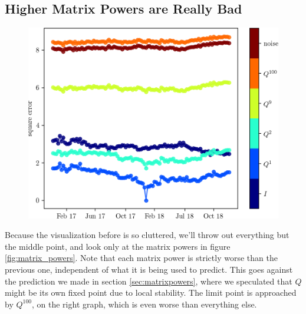 \documentclass{article}
\theoremstyle{definition}
\begin{document}
	\clearpage
	\subsection{Higher Matrix Powers are Really Bad}
	
	\begin{figure}
		\includegraphics[width=\linewidth]{figs/t_vs_err/Q_powers_limit.png}
	\end{figure}
	Because the visualization before is so cluttered, we'll throw out everything but the middle point, and look only at the matrix powers in figure \ref{fig:matrix_powers}. Note that each matrix power is strictly worse than the previous one, independent of what it is being used to predict. This goes against the prediction we made in section \ref{sec:matrixpowers}, where we speculated that $Q$ might be its own fixed point due to local stability. The limit point is approached by $Q^{100}$, on the right graph, which is even worse than everything else.
	
\end{document}
